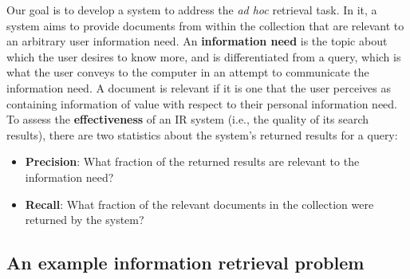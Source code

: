 \documentclass[letterpaper,11pt]{article}
\begin{document}
Our goal is to develop a system to address the \textit{ad hoc} retrieval task. In it, a system aims to provide documents from within the collection that are relevant to an arbitrary user information need. An \textbf{information need} is the topic about which the user desires to know more, and is differentiated from a query, which is what the user conveys to the computer in an attempt to communicate the information need. A document is relevant if it is one that the user perceives as containing information of value with respect to their personal information need. To assess the \textbf{effectiveness} of an IR system (i.e., the quality of its search results), there are two statistics about the system's returned results for a query:
\begin{itemize}
    \item \textbf{Precision}: What fraction of the returned results are relevant to the information need?
    \item \textbf{Recall}: What fraction of the relevant documents in the collection were returned by the system?
\end{itemize}

\subsection{An example information retrieval problem}
\end{document}
